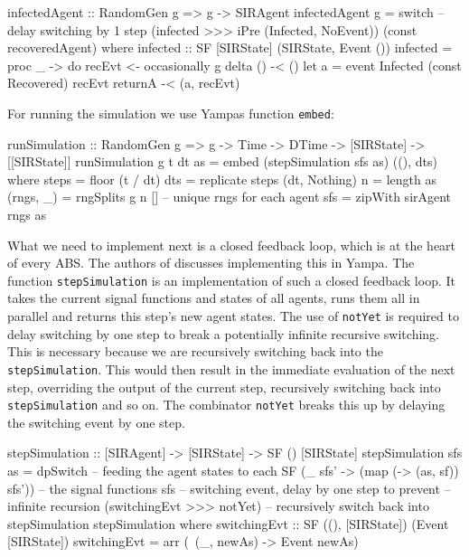 \begin{HaskellCode}
infectedAgent :: RandomGen g => g -> SIRAgent
infectedAgent g 
    = switch 
      -- delay switching by 1 step 
      (infected >>> iPre (Infected, NoEvent))
      (const recoveredAgent)
  where
    infected :: SF [SIRState] (SIRState, Event ())
    infected = proc _ -> do
      recEvt <- occasionally g delta () -< ()
      let a = event Infected (const Recovered) recEvt
      returnA -< (a, recEvt)
\end{HaskellCode}

For running the simulation we use Yampas function \texttt{embed}:

\begin{HaskellCode}
runSimulation :: RandomGen g => g -> Time -> DTime -> [SIRState] -> [[SIRState]]
runSimulation g t dt as 
    = embed (stepSimulation sfs as) ((), dts)
  where
    steps     = floor (t / dt)
    dts       = replicate steps (dt, Nothing)
    n         = length as
    (rngs, _) = rngSplits g n [] -- unique rngs for each agent
    sfs       = zipWith sirAgent rngs as
\end{HaskellCode}

What we need to implement next is a closed feedback loop, which is at the heart of every ABS. The authors of \cite{courtney_yampa_2003, nilsson_functional_2002} discusses implementing this in Yampa. The function \texttt{stepSimulation} is an implementation of such a closed feedback loop. It takes the current signal functions and states of all agents, runs them all in parallel and returns this step's new agent states. The use of \texttt{notYet} is required to delay switching by one step to break a potentially infinite recursive switching. This is necessary because we are recursively switching back into the \texttt{stepSimulation}. This would then result in the immediate evaluation of the next step, overriding the output of the current step, recursively switching back into \texttt{stepSimulation} and so on. The combinator \texttt{notYet} breaks this up by delaying the switching event by one step.

\begin{HaskellCode}
stepSimulation :: [SIRAgent] -> [SIRState] -> SF () [SIRState]
stepSimulation sfs as =
    dpSwitch
      -- feeding the agent states to each SF
      (\_ sfs' -> (map (\sf -> (as, sf)) sfs'))
      -- the signal functions
      sfs
      -- switching event, delay by one step to prevent
      -- infinite recursion
      (switchingEvt >>> notYet)
      -- recursively switch back into stepSimulation         
      stepSimulation                            
  where
    switchingEvt :: SF ((), [SIRState]) (Event [SIRState])
    switchingEvt = arr (\ (_, newAs) -> Event newAs)
\end{HaskellCode}

